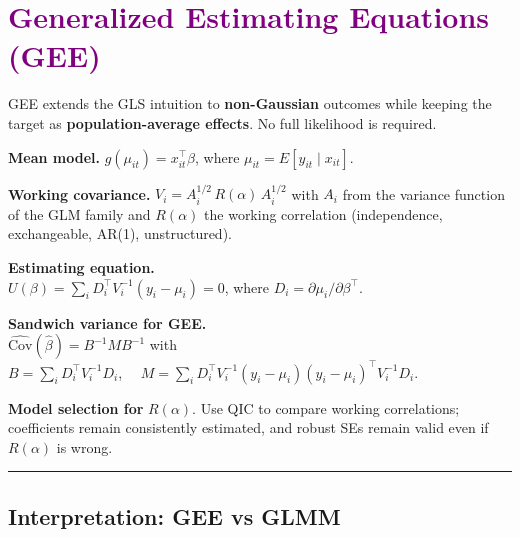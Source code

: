 \documentclass[
  letterpaper,
  DIV=11,
  numbers=noendperiod]{scrreprt}
\begin{document}

\hypertarget{section-19}{%
\chapter*{\texorpdfstring{\textcolor{purple}{Generalized Estimating Equations (GEE)}}{}}\label{section-19}}

\markboth{\textcolor{purple}{Generalized Estimating Equations (GEE)}}{\textcolor{purple}{Generalized Estimating Equations (GEE)}}

GEE extends the GLS intuition to \textbf{non-Gaussian} outcomes while
keeping the target as \textbf{population-average effects}. No full
likelihood is required.

\textbf{Mean model.} \(g(\mu_{it})=x_{it}^\top\beta\), where
\(\mu_{it}=E[y_{it}\mid x_{it}]\).

\textbf{Working covariance.} \(V_i=A_i^{1/2}\,R(\alpha)\,A_i^{1/2}\)
with \(A_i\) from the variance function of the GLM family and
\(R(\alpha)\) the working correlation (independence, exchangeable,
AR(1), unstructured).

\textbf{Estimating equation.}\\
\(U(\beta)=\sum_i D_i^\top V_i^{-1}(y_i-\mu_i)=0\), where
\(D_i=\partial\mu_i/\partial\beta^\top\).

\textbf{Sandwich variance for GEE.}\\
\(\widehat{\mathrm{Cov}}(\hat\beta)=B^{-1}MB^{-1}\) with\\
\(B=\sum_i D_i^\top V_i^{-1}D_i\),
\(\quad M=\sum_i D_i^\top V_i^{-1}(y_i-\mu_i)(y_i-\mu_i)^\top V_i^{-1}D_i\).

\textbf{Model selection for} \(R(\alpha)\). Use QIC to compare working
correlations; coefficients remain consistently estimated, and robust SEs
remain valid even if \(R(\alpha)\) is wrong.

\begin{center}\rule{0.5\linewidth}{0.5pt}\end{center}

\hypertarget{interpretation-gee-vs-glmm}{%
\section*{Interpretation: GEE vs
GLMM}\label{interpretation-gee-vs-glmm}}

\end{document}
